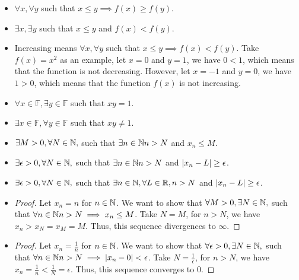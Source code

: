 \documentclass[8pt]{article}
\begin{document}
\begin{Answer}[number=2.3.14]
  \begin{itemize}
    \item $\forall x, \forall y$ such that $x\le y\implies f(x)\ge f(y)$.
    \item $\exists x, \exists y$ such that $x\le y$ and $f(x) < f(y)$.
    \item Increasing means $\forall x, \forall y$ such that $x\le y\implies
      f(x)< f(y)$. Take $f(x) = x^2$ as an example, let $x=0$ and $y=1$, we
      have $0<1$, which means that the function is not decreasing. However, let
      $x = -1$ and $y=0$, we have $1>0$, which means that the function $f(x)$
      is not increasing.
  \end{itemize}
\end{Answer}

\begin{Answer}[number=2.3.16]
  \begin{itemize}
    \item $\forall x \in \mathbb{F}, \exists y \in \mathbb{F}$ such that
      $xy=1$.
    \item $\exists x \in \mathbb{F}, \forall y \in \mathbb{F}$ such that
      $xy\ne1$.
  \end{itemize}
\end{Answer}

\begin{Answer}[number=2.3.17]
  \begin{itemize}
    \item $\exists M > 0, \forall N \in \mathbb{N},$ such that $\exists n\in \mathbb{N} n>N$
      and $x_n \le M$.
    \item $\exists \epsilon > 0, \forall N \in \mathbb{N},$ such that $\exists n\in \mathbb{N} n>N$
      and $\abs{x_n - L}\ge \epsilon$.
    \item $\exists \epsilon > 0, \forall N \in \mathbb{N},$ such that $\exists n\in \mathbb{N},
      \forall L \in \mathbb{R}, n>N$ and $\abs{x_n - L}\ge \epsilon$.
    \item \begin{proof}
      Let $x_n=n$ for $n\in \mathbb{N}$. We want to show that $\forall M > 0, \exists N
      \in \mathbb{N},$ such that $\forall n\in \mathbb{N} n>N \implies x_n \le M$. Take $N=M$,
      for $n>N$, we have $x_n > x_{N} = x_{M} = M$. Thus, this sequence
      divergences to $\infty$.
    \end{proof}
    \item \begin{proof}
      Let $x_n=\frac{1}{n}$ for $n\in \mathbb{N}$. We want to show that $\forall
      \epsilon > 0, \exists N \in \mathbb{N},$ such that $\forall n\in \mathbb{N} n>N \implies
      \abs{x_n-0} < \epsilon$. Take $N=\frac{1}{\epsilon}$, for $n>N$, we have
      $x_n = \frac{1}{n} < \frac{1}{N} = \epsilon$. Thus, this sequence
      converges to $0$.
    \end{proof}
  \end{itemize}
\end{Answer}
\end{document}
